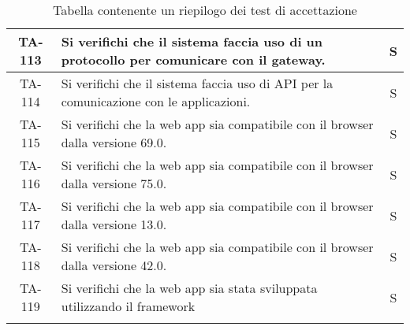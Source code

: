\begin{center}
\begin{longtable}{|c|p{10cm}|c|}
			 \hline
			 TA-113 & Si verifichi che il sistema faccia uso di un protocollo per comunicare con il gateway. & S \\
			 \hline
			 TA-114 & Si verifichi che il sistema faccia uso di API per la comunicazione con le applicazioni. & S \\
			 \hline
			 TA-115 & Si verifichi che la web app sia compatibile con il browser \glock{Firefox} dalla versione 69.0. & S \\
			 \hline
			 TA-116 & Si verifichi che la web app sia compatibile con il browser \glock{Chrome} dalla versione 75.0. & S \\
			 \hline
			 TA-117 & Si verifichi che la web app sia compatibile con il browser \glock{Safari} dalla versione 13.0. & S \\
			 \hline
			 TA-118 & Si verifichi che la web app sia compatibile con il browser \glock{Edge} dalla versione 42.0. & S \\
			 \hline
			 TA-119 & Si verifichi che la web app sia stata sviluppata utilizzando il framework \glock{Bootstrap} & S \\
			 \hline

			 \caption{Tabella contenente un riepilogo dei test di accettazione}
			\end{longtable}
		\end{center}
		
